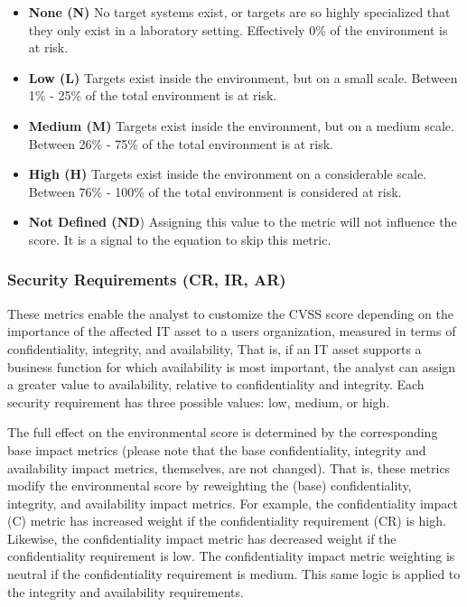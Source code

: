   \begin{itemize}
  \item
    \textbf{None (N)} No target systems exist, or targets are so highly
    specialized that they only exist in a laboratory setting. Effectively
    0\% of the environment is at risk.
  \item
    \textbf{Low (L)} Targets exist inside the environment, but on a small
    scale. Between 1\% - 25\% of the total environment is at risk.
  \item
    \textbf{Medium (M)} Targets exist inside the environment, but on a
    medium scale. Between 26\% - 75\% of the total environment is at risk.
  \item
    \textbf{High (H)} Targets exist inside the environment on a
    considerable scale. Between 76\% - 100\% of the total environment is
    considered at risk.
  \item
    \textbf{Not Defined (ND}) Assigning this value to the metric will not
    influence the score. It is a signal to the equation to skip this
    metric.
  \end{itemize}

  \subsubsection{Security Requirements (CR, IR,
  AR)}\label{security-requirements-cr-ir-ar}

  These metrics enable the analyst to customize the CVSS score depending
  on the importance of the affected IT asset to a users organization,
  measured in terms of confidentiality, integrity, and availability, That
  is, if an IT asset supports a business function for which availability
  is most important, the analyst can assign a greater value to
  availability, relative to confidentiality and integrity. Each security
  requirement has three possible values: low, medium, or high.

  The full effect on the environmental score is determined by the
  corresponding base impact metrics (please note that the base
  confidentiality, integrity and availability impact metrics, themselves,
  are not changed). That is, these metrics modify the environmental score
  by reweighting the (base) confidentiality, integrity, and availability
  impact metrics. For example, the confidentiality impact (C) metric has
  increased weight if the confidentiality requirement (CR) is high.
  Likewise, the confidentiality impact metric has decreased weight if the
  confidentiality requirement is low. The confidentiality impact metric
  weighting is neutral if the confidentiality requirement is medium. This
  same logic is applied to the integrity and availability requirements.

